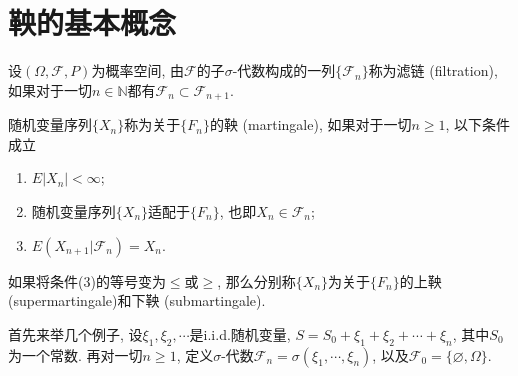 \documentclass[cn, 12pt, math=mtpro2, bibstyle=apa, blue, twocol]{elegantbook}
\newcommand{\F}{\mathcal{F}}
\let\emptyset\varnothing
\begin{document}
\section{鞅的基本概念}
\begin{definition}
设$(\Omega,\F,P)$为概率空间, 由$\F$的子$\sigma$-代数构成的一列$\{\F_n\}$称为滤链 (filtration), 如果对于一切$n\in\mathbb{N}$都有$\F_n\subset\F_{n+1}$.
\end{definition}

\begin{definition}
随机变量序列$\{X_n\}$称为关于$\{F_n\}$的鞅 (martingale), 如果对于一切$n\ge1$, 以下条件成立
\begin{enumerate}[label=(\arabic*)]
  \item $E|X_n|<\infty$;
  \item 随机变量序列$\{X_n\}$适配于$\{F_n\}$, 也即$X_n\in\F_n$;
  \item $E(X_{n+1}|\F_n)=X_n$.
\end{enumerate}
如果将条件(3)的等号变为$\leq$或$\geq$, 那么分别称$\{X_n\}$为关于$\{F_n\}$的上鞅 (supermartingale)和下鞅 (submartingale).
\end{definition}

首先来举几个例子, 设$\xi_1,\xi_2,\cdots$是i.i.d.随机变量, $S=S_0+\xi_1+\xi_2+\cdots+\xi_n$, 其中$S_0$为一个常数. 再对一切$n\ge1$, 定义$\sigma$-代数$\F_n=\sigma(\xi_1,\cdots,\xi_n)$, 以及$\F_0=\{\emptyset,\Omega\}$.
\end{document}
